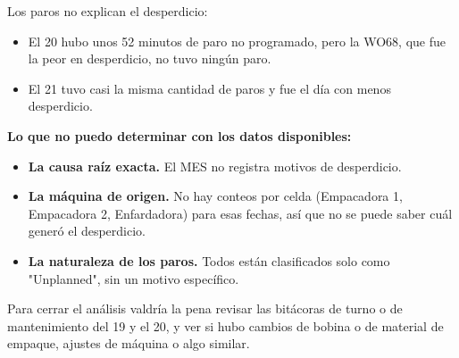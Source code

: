 \begin{singlespace}
{Los paros no explican el desperdicio:

\begin{itemize}[leftmargin=1.2em,itemsep=0pt,topsep=2pt]
\item El 20 hubo unos 52 minutos de paro no programado, pero la WO68, que fue la peor en desperdicio, no tuvo ningún paro.
\item El 21 tuvo casi la misma cantidad de paros y fue el día con menos desperdicio.
\end{itemize}



\textbf{Lo que no puedo determinar con los datos disponibles:}

\begin{itemize}[leftmargin=1.2em,itemsep=0pt,topsep=2pt]
\item \textbf{La causa raíz exacta.} El MES no registra motivos de desperdicio.
\item \textbf{La máquina de origen.} No hay conteos por celda (Empacadora 1, Empacadora 2, Enfardadora) para esas fechas, así que no se puede saber cuál generó el desperdicio.
\item \textbf{La naturaleza de los paros.} Todos están clasificados solo como "Unplanned", sin un motivo específico.
\end{itemize}



Para cerrar el análisis valdría la pena revisar las bitácoras de turno o de mantenimiento del 19 y el 20, y ver si hubo cambios de bobina o de material de empaque, ajustes de máquina o algo similar.}



\end{singlespace}
